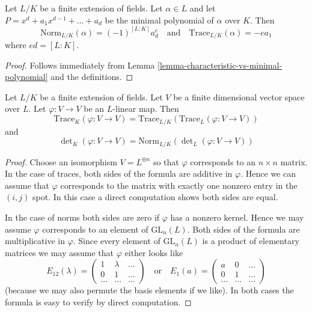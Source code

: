 \begin{lemma}
\label{lemma-trace-and-norm-from-minimal-polynomial}
Let $L/K$ be a finite extension of fields. Let $\alpha \in L$ and let
$P = x^d + a_1 x^{d - 1} + \ldots + a_d$
be the minimal polynomial of $\alpha$ over $K$. Then
$$
\text{Norm}_{L/K}(\alpha) = (-1)^{[L : K]} a_d^e
\quad\text{and}\quad
\text{Trace}_{L/K}(\alpha) = - e a_1
$$
where $e d = [L : K]$.
\end{lemma}

\begin{proof}
Follows immediately from Lemma \ref{lemma-characteristic-vs-minimal-polynomial}
and the definitions.
\end{proof}

\begin{lemma}
\label{lemma-trace-and-norm-linear}
Let $L/K$ be a finite extension of fields. Let $V$ be a finite dimensional
vector space over $L$. Let $\varphi : V \to V$ be an $L$-linear map.
Then
$$
\text{Trace}_K(\varphi : V \to V) =
\text{Trace}_{L/K}(\text{Trace}_L(\varphi : V \to V))
$$
and
$$
\det\nolimits_K(\varphi : V \to V) =
\text{Norm}_{L/K}(\det\nolimits_L(\varphi : V \to V))
$$
\end{lemma}

\begin{proof}
Choose an isomorphism $V = L^{\oplus n}$ so that $\varphi$ corresponds
to an $n \times n$ matrix. In the case of traces, both sides of the formula
are additive in $\varphi$. Hence we can assume that $\varphi$
corresponds to the matrix with exactly one nonzero entry in the $(i, j)$ spot.
In this case a direct computation shows both sides are equal.

\medskip\noindent
In the case of norms both sides are zero if $\varphi$ has a nonzero kernel.
Hence we may assume $\varphi$ corresponds to an element of
$\text{GL}_n(L)$. Both sides of the formula are multiplicative in $\varphi$.
Since every element of $\text{GL}_n(L)$ is a product of elementary
matrices we may assume that $\varphi$ either looks like
$$
E_{12}(\lambda) =
\left(
\begin{matrix}
1 & \lambda & \ldots \\
0 & 1 & \ldots \\
\ldots & \ldots & \ldots
\end{matrix}
\right)
\quad\text{or}\quad
E_1(a) =
\left(
\begin{matrix}
a & 0 & \ldots \\
0 & 1 & \ldots \\
\ldots & \ldots & \ldots
\end{matrix}
\right)
$$
(because we may also permute the basis elements if we like).
In both cases the formula is easy to verify by direct computation.
\end{proof}

